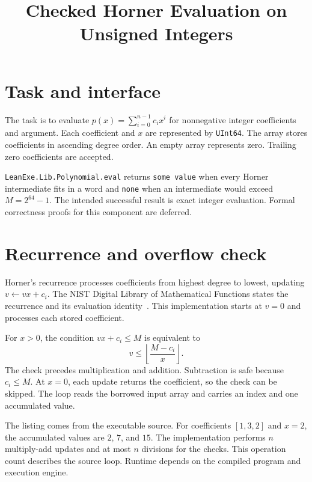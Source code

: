 
\title{Checked Horner Evaluation on Unsigned Integers}

\maketitle

\section{Task and interface}
The task is to evaluate $p(x)=\sum_{i=0}^{n-1}c_i x^i$ for nonnegative integer
coefficients and argument.  Each coefficient and $x$ are represented by
\texttt{UInt64}.  The array stores coefficients in ascending degree order.
An empty array represents zero.  Trailing zero coefficients are accepted.

\texttt{LeanExe.Lib.Polynomial.eval} returns \texttt{some value} when every
Horner intermediate fits in a word and \texttt{none} when an intermediate
would exceed $M=2^{64}-1$.  The intended successful result is exact integer
evaluation.  Formal correctness proofs for this component are deferred.

\section{Recurrence and overflow check}
Horner's recurrence processes coefficients from highest degree to lowest,
updating $v\leftarrow vx+c_i$.  The NIST Digital Library of Mathematical
Functions states the recurrence and its evaluation identity~\cite{horner}.
This implementation starts at $v=0$ and processes each stored coefficient.

For $x>0$, the condition $vx+c_i\leq M$ is equivalent to
\[
  v\leq\left\lfloor\frac{M-c_i}{x}\right\rfloor.
\]
The check precedes multiplication and addition.  Subtraction is safe because
$c_i\leq M$.  At $x=0$, each update returns the coefficient, so the check can
be skipped.  The loop reads the borrowed input array and carries an index
and one accumulated value.



The listing comes from the executable source.  For coefficients $[1,3,2]$
and $x=2$, the accumulated values are $2$, $7$, and $15$.  The implementation
performs $n$ multiply-add updates and at most $n$ divisions for the checks.
This operation count describes the source loop.  Runtime depends on the
compiled program and execution engine.

